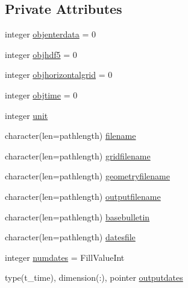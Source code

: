 \subsection*{Private Attributes}
\begin{DoxyCompactItemize}
\item 
integer \mbox{\hyperlink{structmodulelevitusformat_1_1t__levitusformat_a04a97a4f7ee6470062f21009d52c1766}{objenterdata}} = 0
\item 
integer \mbox{\hyperlink{structmodulelevitusformat_1_1t__levitusformat_a1fa5442bb71e8b0e18b51cfdd3229a78}{objhdf5}} = 0
\item 
integer \mbox{\hyperlink{structmodulelevitusformat_1_1t__levitusformat_ac475f88cb943f0ed956cc6f0e4edc69a}{objhorizontalgrid}} = 0
\item 
integer \mbox{\hyperlink{structmodulelevitusformat_1_1t__levitusformat_a986e9d18b87de1d2922eede7b7ee4975}{objtime}} = 0
\item 
integer \mbox{\hyperlink{structmodulelevitusformat_1_1t__levitusformat_ad8dceedd05c1eb889eae16febf70abca}{unit}}
\item 
character(len=pathlength) \mbox{\hyperlink{structmodulelevitusformat_1_1t__levitusformat_a22ac578d24f4881a973799a443f0e8eb}{filename}}
\item 
character(len=pathlength) \mbox{\hyperlink{structmodulelevitusformat_1_1t__levitusformat_addfca6fb454697de1e218fad946a6df9}{gridfilename}}
\item 
character(len=pathlength) \mbox{\hyperlink{structmodulelevitusformat_1_1t__levitusformat_ac80c80f071166c5c3a865768719db6b0}{geometryfilename}}
\item 
character(len=pathlength) \mbox{\hyperlink{structmodulelevitusformat_1_1t__levitusformat_a75ebd18e194b1e603cfd8cc846faf7d3}{outputfilename}}
\item 
character(len=pathlength) \mbox{\hyperlink{structmodulelevitusformat_1_1t__levitusformat_acbd81e30937b6b3bed4808000915f553}{basebulletin}}
\item 
character(len=pathlength) \mbox{\hyperlink{structmodulelevitusformat_1_1t__levitusformat_a7fcae574e75abbe756fe3f543371016d}{datesfile}}
\item 
integer \mbox{\hyperlink{structmodulelevitusformat_1_1t__levitusformat_a6597d30019d510945a1eeda780505373}{numdates}} = Fill\+Value\+Int
\item 
type(t\+\_\+time), dimension(\+:), pointer \mbox{\hyperlink{structmodulelevitusformat_1_1t__levitusformat_a602b5b3e4495391bfe057c20b9470138}{outputdates}}

\end{DoxyCompactItemize}
